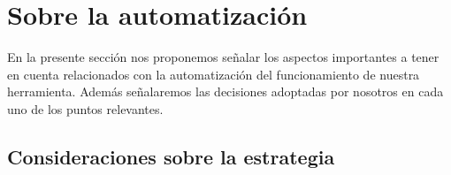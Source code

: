 
\section{Sobre la automatización}

En la presente sección nos proponemos señalar los aspectos importantes a tener
en cuenta relacionados con la automatización del funcionamiento de nuestra
herramienta. Además señalaremos las decisiones adoptadas por nosotros en cada
uno de los puntos relevantes.

\subsection{Consideraciones sobre la estrategia}









